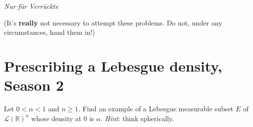 \emph{Nur für Verrückte}

(It's \textbf{really} not necessary to attempt these problems. Do not, under any circumstances, hand them in!)

\section{Prescribing a Lebesgue density, Season 2}\label{prescribing-a-lebesgue-density-season-2}

Let \(0 < \alpha < 1\) and \(n \geq 1\). Find an example of a Lebesgue measurable subset \(E\) of \(\mathcal{L}(\mathbb{R})^{n}\) whose density at \(0\) is \(\alpha\). \emph{Hint}: think spherically.
